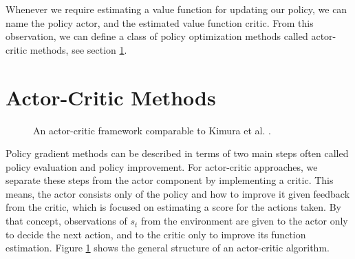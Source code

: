 Whenever we require estimating a value function for updating our policy, we can name the policy actor, and the estimated value function critic. From this observation, we can define a class of policy optimization methods called actor-critic methods, see section \ref{sec:ac}.

\section{Actor-Critic Methods} 
\label{sec:ac}

\begin{figure}
  \caption{An actor-critic framework comparable to Kimura et al.  \cite{Kimura1998AnAO}.} \label{fig:ac}
\end{figure}

Policy gradient methods can be described in terms of two main steps often called policy evaluation and policy improvement. For actor-critic approaches, we separate these steps from the actor component by implementing a critic. This means, the actor consists only of the policy and how to improve it given feedback from the critic, which is focused on estimating a score for the actions taken. By that concept, observations of $s_t$ from the environment are given to the actor only to decide the next action, and to the critic only to improve its function estimation. Figure \ref{fig:ac} shows the general structure of an actor-critic algorithm.

